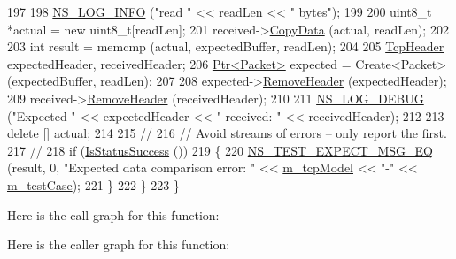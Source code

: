 \begin{DoxyCode}
197 
198       \hyperlink{group__logging_gafbd73ee2cf9f26b319f49086d8e860fb}{NS\_LOG\_INFO} (\textcolor{stringliteral}{"read "} << readLen << \textcolor{stringliteral}{" bytes"});
199 
200       uint8\_t *actual = \textcolor{keyword}{new} uint8\_t[readLen];
201       received->\hyperlink{classns3_1_1Packet_a5a6d304b9e0d90733919ffe224b98f0d}{CopyData} (actual, readLen);
202 
203       \textcolor{keywordtype}{int} result = memcmp (actual, expectedBuffer, readLen);
204 
205       \hyperlink{classns3_1_1TcpHeader}{TcpHeader} expectedHeader, receivedHeader;
206       \hyperlink{classns3_1_1Ptr}{Ptr<Packet>} expected = Create<Packet> (expectedBuffer, readLen);
207 
208       expected->\hyperlink{classns3_1_1Packet_a0961eccf975d75f902d40956c93ba63e}{RemoveHeader} (expectedHeader);
209       received->\hyperlink{classns3_1_1Packet_a0961eccf975d75f902d40956c93ba63e}{RemoveHeader} (receivedHeader);
210 
211       \hyperlink{group__logging_ga413f1886406d49f59a6a0a89b77b4d0a}{NS\_LOG\_DEBUG} (\textcolor{stringliteral}{"Expected "} << expectedHeader << \textcolor{stringliteral}{" received: "} << receivedHeader);
212 
213       \textcolor{keyword}{delete} [] actual;
214 
215       \textcolor{comment}{//}
216       \textcolor{comment}{// Avoid streams of errors -- only report the first.}
217       \textcolor{comment}{//}
218       \textcolor{keywordflow}{if} (\hyperlink{classns3_1_1TestCase_a76d97c8d3aadccc6231e50d863cde388}{IsStatusSuccess} ())
219         \{
220           \hyperlink{group__testing_ga7304ba46a28d8cf08dfdfd6499cf7068}{NS\_TEST\_EXPECT\_MSG\_EQ} (result, 0, \textcolor{stringliteral}{"Expected data comparison error: "} << 
      \hyperlink{classNs3TcpLossTestCase_afbac387ba94a6b5cd8760f688bab5008}{m\_tcpModel} << \textcolor{stringliteral}{"-"} << \hyperlink{classNs3TcpLossTestCase_a7a8850910d9da65bebe441babd05f979}{m\_testCase});
221         \}
222     \}
223 \}
\end{DoxyCode}


Here is the call graph for this function\+:




Here is the caller graph for this function\+:


